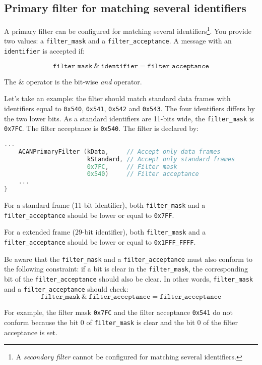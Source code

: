 \documentclass[10pt, a4paper, obeyspaces, openany]{extarticle}
\newcommand \subsectionLabel[2]{\subsection{#1}\label{subsec:#2}}
\begin{document}
\subsectionLabel{Primary filter for matching several identifiers}{primaryMultipleFilter}

A primary filter can be configured for matching several identifiers\footnote{A \emph{secondary filter} cannot be configured for matching several identifiers.}. You provide two values: a \texttt{filter\_mask} and a \texttt{filter\_acceptance}. A message with an \texttt{identifier} is accepted if:

\begin{equation*}
  \texttt{filter\_mask}~\&~\texttt{identifier} = \texttt{filter\_acceptance}
\end{equation*}

The $\&$ operator is the bit-wise \emph{and} operator.

Let's take an example: the filter should match standard data frames with identifiers equal to \texttt{0x540}, \texttt{0x541}, \texttt{0x542} and \texttt{0x543}. The four identifiers differs by the two lower bits. As a standard identifiers are 11-bits wide, the \texttt{filter\_mask} is \texttt{0x7FC}. The filter acceptance is \texttt{0x540}. The filter is declared by:

{ \small\begin{lstlisting}[language=c++]
    ...
    ACANPrimaryFilter (kData,     // Accept only data frames
                       kStandard, // Accept only standard frames
                       0x7FC,     // Filter mask
                       0x540)     // Filter acceptance
    ...
}
\end{lstlisting}}

For a standard frame (11-bit identifier), both \texttt{filter\_mask} and a \texttt{filter\_acceptance} should be lower or equal to \texttt{0x7FF}.

For a extended frame (29-bit identifier), both \texttt{filter\_mask} and a \texttt{filter\_acceptance} should be lower or equal to \texttt{0x1FFF\_FFFF}.

Be aware that the \texttt{filter\_mask} and a \texttt{filter\_acceptance} must also conform to the following constraint: if a bit is clear in the \texttt{filter\_mask}, the corresponding bit of the \texttt{filter\_acceptance} should also be clear. In other words, \texttt{filter\_mask} and a \texttt{filter\_acceptance} should check:
\begin{equation*}
  \texttt{filter\_mask}~\&~\texttt{filter\_acceptance} = \texttt{filter\_acceptance}
\end{equation*}

For example, the filter mask \texttt{0x7FC} and the filter acceptance \texttt{0x541} do not conform because the bit 0 of \texttt{filter\_mask} is clear and the bit 0 of the filter acceptance is set.
\end{document}
